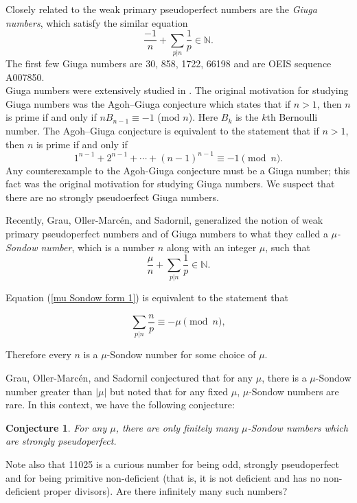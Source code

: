 \documentclass{article}
\newtheorem{conjecture}[theorem]{Conjecture}
\begin{document}
Closely related to the weak primary pseudoperfect numbers are the \emph{Giuga numbers}, which satisfy the similar equation $$\frac{-1}{n}+\sum_{p|n} \frac{1}{p} \in \mathbb{N}.$$ The first few Giuga numbers are 30, 858, 1722, 66198 and are OEIS sequence A007850.\\

Giuga numbers were extensively studied in  \cite{Borwein}. The original motivation for studying Giuga numbers was the Agoh–Giuga conjecture which states that if $n >1$, then $n$ is prime if and only if $nB_{n-1} \equiv -1$ (mod $n$). Here $B_k$ is the $k$th Bernoulli number.  The Agoh–Giuga conjecture is equivalent to the statement that if $n > 1$, then $n$ is prime if and only if $$1^{n-1}+2^{n-1}+ \cdots +(n-1)^{n-1} \equiv -1 \pmod n.$$ Any counterexample to the Agoh-Giuga conjecture must be a Giuga number; this fact was the original motivation for studying Giuga numbers. We suspect that there are no strongly pseudoerfect Giuga numbers. 

Recently, Grau, Oller-Marc\'en, and Sadornil\cite{GOS}, generalized the notion of weak primary pseudoperfect numbers and of Giuga numbers to what they called a \emph{$\mu$-Sondow number}, which is a number $n$ along with an integer $\mu$, such that 
\begin{equation}\frac{\mu}{n}+\sum_{p|n} \frac{1}{p} \in \mathbb{N}. \label{mu Sondow form 1}\end{equation}

Equation (\ref{mu Sondow form 1}) is equivalent to the statement that 

\begin{equation}\sum_{p|n} \frac{n}{p} \equiv -\mu \pmod n, \label{mu Sondow form 2}\end{equation}

Therefore every $n$ is a $\mu$-Sondow number for some choice of $\mu$.

Grau, Oller-Marc\'en, and Sadornil conjectured that for any  $\mu$, there is a $\mu$-Sondow number greater than $|\mu|$ but noted that for any fixed $\mu$,  $\mu$-Sondow numbers are rare.  In this context, we have the following conjecture:

\begin{conjecture} \label{Finite strongly pseudoperfect for any mu}
For any $\mu$, there are only finitely many $\mu$-Sondow numbers which are strongly  pseudoperfect. \end{conjecture}

Note also that 11025 is a curious number for being odd, strongly pseudoperfect and for being primitive non-deficient (that is, it is not deficient and has no non-deficient proper divisors). Are there infinitely many such numbers?
\end{document}
